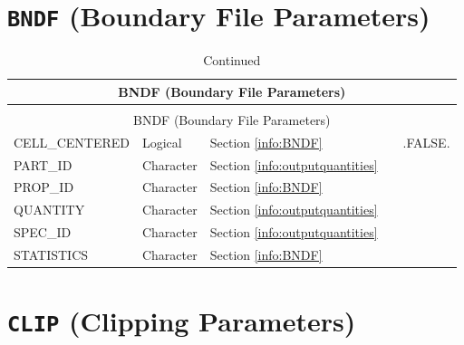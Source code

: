 \documentclass[11pt]{book}
\begin{document}
\section{\texorpdfstring{{\tt BNDF}}{BNDF} (Boundary File Parameters)}

\begin{longtable}{@{\extracolsep{\fill}}|l|l|l|l|l|}
\caption[Boundary file parameters ({\ct BNDF} namelist group)]{For more information see Section~\ref{info:BNDF}.}
\label{tbl:BNDF} \\
\hline
\multicolumn{5}{|c|}{{\ct BNDF} (Boundary File Parameters)} \\
\hline \hline
\endfirsthead
\caption[]{Continued} \\
\hline
\multicolumn{5}{|c|}{{\ct BNDF} (Boundary File Parameters)} \\
\hline \hline
\endhead
{\ct CELL\_CENTERED}    & Logical     & Section \ref{info:BNDF}                 &           & {\ct .FALSE.}   \\ \hline
{\ct PART\_ID}          & Character   & Section \ref{info:outputquantities}     &           &                 \\ \hline
{\ct PROP\_ID}          & Character   & Section \ref{info:BNDF}                 &           &                 \\ \hline
{\ct QUANTITY}          & Character   & Section \ref{info:outputquantities}     &           &                 \\ \hline
{\ct SPEC\_ID}          & Character   & Section \ref{info:outputquantities}     &           &                 \\ \hline
{\ct STATISTICS}        & Character   & Section \ref{info:BNDF}                 &           &                 \\ \hline
\end{longtable}


\vspace{\baselineskip}

\section{\texorpdfstring{{\tt CLIP}}{CLIP} (Clipping Parameters)}
\end{document}
